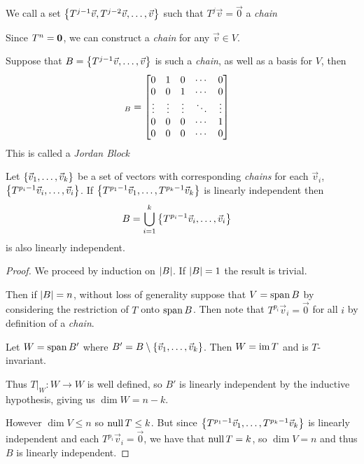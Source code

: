 \begin{definition}[Chain]
  We call a set $\left\{T^{j-1}\vec v, T^{j-2}\vec v, \ldots, \vec v\right\}$ such that $T^j\vec v = \vec 0$ a \emph{chain}
\end{definition}
\begin{remark}
  Since $T^n = {\bf 0}$, we can construct a \emph{chain} for any $\vec v \in V$.
\end{remark}
\begin{remark}
  Suppose that $B = \left\{T^{j-1}\vec v, \ldots, \vec v\right\}$ is such a \emph{chain}, as well as a basis for $V$, then
  \begin{align}
    [T]_B &= \bmatr{
      0 & 1 & 0 & \cdots & 0 \\
      0 & 0 & 1 & \cdots & 0 \\
      \vdots & \vdots & \vdots & \ddots & \vdots \\
      0 & 0 & 0 & \cdots & 1 \\
      0 & 0 & 0 & \cdots & 0
    }
  \end{align}
  This is called a \emph{Jordan Block}
\end{remark}

\begin{theorem}
  Let $\left\{\vec v_1,\ldots,\vec v_k\right\}$ be a set of vectors with corresponding \emph{chains} for each $\vec v_i$,
  $\left\{T^{p_i-1}\vec v_i,\ldots,\vec v_i\right\}$. If $\left\{T^{p_1-1}\vec v_1,\ldots,T^{p_k-1}\vec v_k\right\}$
  is linearly independent then
  \begin{align}
    B &= \bigcup_{i=1}^k\left\{T^{p_i-1}\vec v_i,\ldots,\vec v_i\right\}
  \end{align}
  is also linearly independent.
\end{theorem}
\begin{proof}
  We proceed by induction on $\left|B\right|$. If $\left|B\right| = 1$ the result is trivial.

  Then if $\left|B\right| = n$, without loss of generality suppose that $V = \operatorname{span} B$ by considering the restriction of $T$ onto $\operatorname{span} B$.
  Then note that $T^{p_i}\vec v_i = \vec 0$ for all $i$ by definition of a \emph{chain}.

  Let $W = \operatorname{span} B'$ where $B' = B \setminus \left\{\vec v_1,\ldots,\vec v_k\right\}$. Then $W = \operatorname{im} T$ and is $T$-invariant.

  Thus $T\big\rvert_{W} : W \to W$ is well defined, so $B'$ is linearly independent by the inductive hypothesis, giving us $\dim W = n - k$.

  However $\dim V \le n$ so $\operatorname{null} T \le k$. But since $\left\{T^{p_1-1}\vec v_1,\ldots,T^{p_k-1}\vec v_k\right\}$ is linearly independent and each $T^{p_i}\vec v_i = \vec 0$,
  we have that $\operatorname{null} T = k$, so $\dim V = n$ and thus $B$ is linearly independent.
\end{proof}
